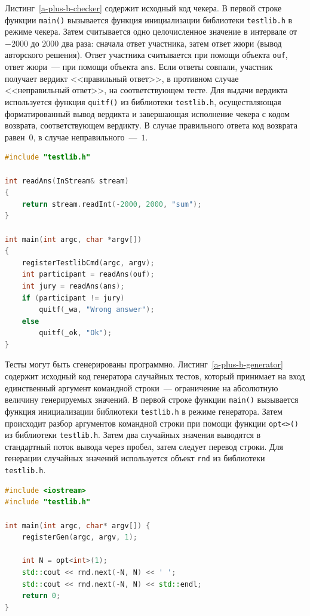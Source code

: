\documentclass[times,specification,annotation]{style/itmo-student-thesis/itmo-student-thesis}
\begin{document}
Листинг~\ref{a-plus-b-checker} содержит исходный код чекера. В первой строке функции \texttt{main()} вызывается функция инициализации библиотеки \texttt{testlib.h} в режиме чекера. Затем считывается одно целочисленное значение в интервале от $-2000$ до $2000$ два раза: сначала ответ участника, затем ответ жюри (вывод авторского решения). Ответ участника считывается при помощи объекта \texttt{ouf}, ответ жюри~--- при помощи объекта \texttt{ans}. Если ответы совпали, участник получает вердикт <<правильный ответ>>, в противном случае <<неправильный ответ>>, на соответствующем тесте. Для выдачи вердикта используется функция \texttt{quitf()} из библиотеки \texttt{testlib.h}, осуществляющая форматированный вывод вердикта и завершающая исполнение чекера с кодом возврата, соответствующем вердикту. В случае правильного ответа код возврата равен~$0$, в случае неправильного~---~$1$.

\begin{lstlisting}[float=!h,caption={Пример чекера},label={a-plus-b-checker},language=c++]
#include "testlib.h"

int readAns(InStream& stream)
{
    return stream.readInt(-2000, 2000, "sum");
}

int main(int argc, char *argv[])
{
    registerTestlibCmd(argc, argv);
    int participant = readAns(ouf);
    int jury = readAns(ans);
    if (participant != jury)
        quitf(_wa, "Wrong answer");
    else
        quitf(_ok, "Ok");
}
\end{lstlisting}

Тесты могут быть сгенерированы программно. Листинг~\ref{a-plus-b-generator} содержит исходный код генератора случайных тестов, который принимает на вход единственный аргумент командной строки~--- ограничение на абсолютную величину генерируемых значений. В первой строке функции \texttt{main()} вызывается функция инициализации библиотеки \texttt{testlib.h} в режиме генератора. Затем происходит разбор аргументов командной строки при помощи функции \texttt{opt<>()} из библиотеки \texttt{testlib.h}. Затем два случайных значения выводятся в стандартный поток вывода через пробел, затем следует перевод строки. Для генерации случайных значений используется объект \texttt{rnd} из библиотеки \texttt{testlib.h}.

\begin{lstlisting}[float=!h,caption={Пример генератора},label={a-plus-b-generator},language=c++]
#include <iostream>
#include "testlib.h"
 
int main(int argc, char* argv[]) {
    registerGen(argc, argv, 1);
 
    int N = opt<int>(1);
    std::cout << rnd.next(-N, N) << ' ';
    std::cout << rnd.next(-N, N) << std::endl;
    return 0;
}
\end{lstlisting}
\end{document}
